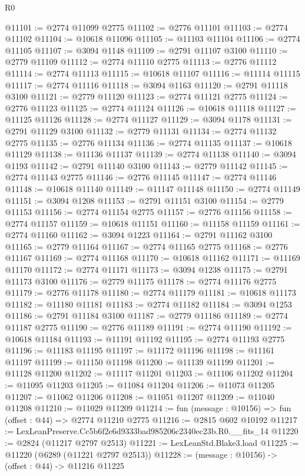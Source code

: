 \begin{lexlean}{R0}
\begin{coremodule}
@11101 := @2774 @11099 @2775
@11102 := @2776 @11101
@11103 := @2774 @11102
@11104 := @10618 @11096
@11105 := @11103 @11104
@11106 := @2774 @11105
@11107 := @3094 @1148
@11109 := @2791 @11107 @3100
@11110 := @2779 @11109
@11112 := @2774 @11110 @2775
@11113 := @2776 @11112
@11114 := @2774 @11113
@11115 := @10618 @11107
@11116 := @11114 @11115
@11117 := @2774 @11116
@11118 := @3094 @1163
@11120 := @2791 @11118 @3100
@11121 := @2779 @11120
@11123 := @2774 @11121 @2775
@11124 := @2776 @11123
@11125 := @2774 @11124
@11126 := @10618 @11118
@11127 := @11125 @11126
@11128 := @2774 @11127
@11129 := @3094 @1178
@11131 := @2791 @11129 @3100
@11132 := @2779 @11131
@11134 := @2774 @11132 @2775
@11135 := @2776 @11134
@11136 := @2774 @11135
@11137 := @10618 @11129
@11138 := @11136 @11137
@11139 := @2774 @11138
@11140 := @3094 @1193
@11142 := @2791 @11140 @3100
@11143 := @2779 @11142
@11145 := @2774 @11143 @2775
@11146 := @2776 @11145
@11147 := @2774 @11146
@11148 := @10618 @11140
@11149 := @11147 @11148
@11150 := @2774 @11149
@11151 := @3094 @1208
@11153 := @2791 @11151 @3100
@11154 := @2779 @11153
@11156 := @2774 @11154 @2775
@11157 := @2776 @11156
@11158 := @2774 @11157
@11159 := @10618 @11151
@11160 := @11158 @11159
@11161 := @2774 @11160
@11162 := @3094 @1223
@11164 := @2791 @11162 @3100
@11165 := @2779 @11164
@11167 := @2774 @11165 @2775
@11168 := @2776 @11167
@11169 := @2774 @11168
@11170 := @10618 @11162
@11171 := @11169 @11170
@11172 := @2774 @11171
@11173 := @3094 @1238
@11175 := @2791 @11173 @3100
@11176 := @2779 @11175
@11178 := @2774 @11176 @2775
@11179 := @2776 @11178
@11180 := @2774 @11179
@11181 := @10618 @11173
@11182 := @11180 @11181
@11183 := @2774 @11182
@11184 := @3094 @1253
@11186 := @2791 @11184 @3100
@11187 := @2779 @11186
@11189 := @2774 @11187 @2775
@11190 := @2776 @11189
@11191 := @2774 @11190
@11192 := @10618 @11184
@11193 := @11191 @11192
@11195 := @2774 @11193 @2775
@11196 := @11183 @11195
@11197 := @11172 @11196
@11198 := @11161 @11197
@11199 := @11150 @11198
@11200 := @11139 @11199
@11201 := @11128 @11200
@11202 := @11117 @11201
@11203 := @11106 @11202
@11204 := @11095 @11203
@11205 := @11084 @11204
@11206 := @11073 @11205
@11207 := @11062 @11206
@11208 := @11051 @11207
@11209 := @11040 @11208
@11210 := @11029 @11209
@11214 := fun (message : @10156) => fun (offset : @44) => @2774 @11210 @2775
@11216 := @2815 @602 @10192
@11217 := LexLeanPreserve.Cc5b6f2e6d9333bad985206c2340ec23b.R0.__fits_14
@11220 := @2824 (@11217 @2797 @2513)
@11221 := LexLeanStd.Blake3.load
@11225 := @11220 (@6289 (@11221 @2797 @2513))
@11228 := (message : @10156) -> (offset : @44) -> @11216 @11225

\end{coremodule}
\end{lexlean}

